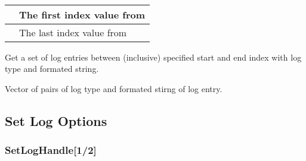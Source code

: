 \documentclass[letterpaper,10pt,english]{sphinxmanual}
\begin{document}
\begin{fulllineitems}
\label{\detokenize{log:_CPPv2N6pessum8VFGetLogEii}}%
\pysigstartmultiline
{}%
\pysigstopmultiline~

\begin{savenotes}\sphinxattablestart
\centering
\begin{tabulary}{\linewidth}[t]{|T|T|}
\hline

&
The first index value from {\hyperref[\detokenize{log:_CPPv2N6pessum11global_logsE}]{}}
\\
\hline
{}
&
The last index value from {\hyperref[\detokenize{log:_CPPv2N6pessum11global_logsE}]{}}
\\
\hline
\end{tabulary}
\par
\sphinxattableend\end{savenotes}

Get a set of log entries between (inclusive) specified start and end index
with log type and formated string.

 Vector of pairs of log type and formated stirng of log entry.

\end{fulllineitems}



\subsection{Set Log Options}
\label{\detokenize{log:set-log-options}}

\subsubsection{SetLogHandle{[}1/2{]}}
\label{\detokenize{log:setloghandle-1-2}}
\end{document}
